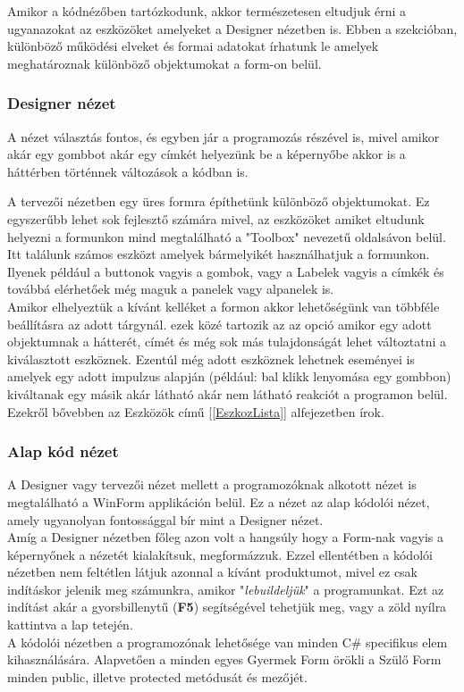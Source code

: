 \documentclass[tocnopagenum]{thesis-ekf}
\theoremstyle{definition}
\theoremstyle{remark}
\begin{document}
	Amikor a kódnézőben tartózkodunk, akkor természetesen eltudjuk érni a ugyanazokat az eszközöket amelyeket a Designer nézetben is.
	Ebben a szekcióban, különböző működési elveket és formai adatokat írhatunk le amelyek meghatároznak különböző objektumokat a form-on belül. \cite{appSysWinform}
	\subsubsection{Designer nézet}
	A nézet választás fontos, és egyben jár a programozás részével is, mivel amikor akár egy gombbot akár egy címkét helyezünk be a képernyőbe akkor is a háttérben történnek változások a kódban is.
	
	A tervezői nézetben egy üres formra építhetünk különböző objektumokat.
	Ez egyszerűbb lehet sok fejlesztő számára mivel, az eszközöket amiket eltudunk helyezni a formunkon mind megtalálható a "Toolbox" nevezetű oldalsávon belül.
	\\
	Itt találunk számos eszközt amelyek bármelyikét használhatjuk a formunkon. Ilyenek például a buttonok vagyis a gombok, vagy a Labelek vagyis a címkék és továbbá elérhetőek még maguk a panelek vagy alpanelek is. 
	\\
	Amikor elhelyeztük a kívánt kelléket a formon akkor lehetőségünk van többféle beállításra az adott tárgynál. ezek közé tartozik az az opció amikor egy adott objektumnak a hátterét, címét és még sok más tulajdonságát lehet változtatni a kiválasztott eszköznek. Ezentúl még adott eszköznek lehetnek eseményei is amelyek egy adott impulzus alapján (például: bal klikk lenyomása egy gombbon) kiváltanak egy másik akár látható akár nem látható reakciót a programon belül. Ezekről bővebben az Eszközök című [\ref{EszkozLista}] alfejezetben írok.
	
	\subsubsection{Alap kód nézet}
	
	A Designer vagy tervezői nézet mellett a programozóknak alkotott nézet is megtalálható a WinForm applikáción belül. Ez a nézet az alap kódolói nézet, amely ugyanolyan fontossággal bír mint a Designer nézet.
	\\
	Amíg a Designer nézetben főleg azon volt a hangsúly hogy a Form-nak vagyis a képernyőnek a nézetét kialakítsuk, megformázzuk. Ezzel ellentétben a kódolói nézetben nem feltétlen látjuk azonnal a kívánt produktumot, mivel ez csak indításkor jelenik meg számunkra, amikor "\textit{lebuildeljük}" a programunkat. Ezt az indítást akár a gyorsbillenytű (\textbf{F5}) segítségével tehetjük meg, vagy a zöld nyílra kattintva a lap tetején.
	\\
	A kódolói nézetben a programozónak lehetősége van minden C\# specifikus elem kihasználására. Alapvetően a minden egyes Gyermek Form örökli a Szülő Form minden public, illetve protected metódusát és mezőjét. 
	\\
\end{document}
